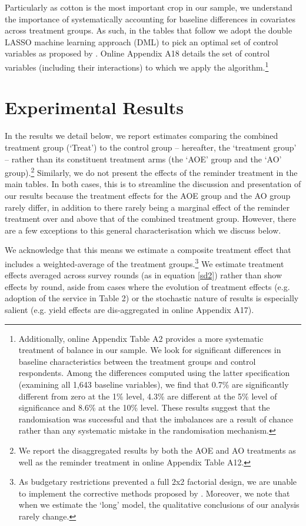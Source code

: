 \documentclass[12pt]{article}
\begin{document}
{\normalsize Particularly as cotton is the most important crop in our sample, we understand the importance of systematically accounting for baseline differences in covariates across treatment groups. As such, in the tables that follow we adopt the double LASSO machine learning approach (DML) to pick an optimal set of control variables as proposed by \citet{belloni2014inference}. Online Appendix A18 details the set of control variables (including their interactions) to which we apply the algorithm.\footnote{Additionally, 
online Appendix Table A2 provides a more systematic treatment of balance in our
sample. We look for significant differences in baseline characteristics
between the treatment groups and control respondents. Among the differences computed using the latter specification
(examining all 1,643 baseline variables), we find that 0.7\% are
significantly different from zero at the 1\% level, 4.3\% are different
at the 5\% level of significance and 8.6\% at the 10\% level. These
results suggest that the randomisation was successful and that the 
imbalances are a result of chance rather than any systematic mistake in the
randomisation mechanism.}}


\section{{\protect\normalsize Experimental Results\label{results}}}

{\normalsize In the results we detail below, we report estimates comparing the combined treatment group (`Treat') to the control group -- hereafter, the `treatment group' -- rather than its constituent treatment arms (the `AOE' group and the `AO' group).\footnote{We report the disaggregated results by both the AOE and AO treatments as well as the reminder treatment in online Appendix Table A12.} Similarly, we do not present the effects of the reminder treatment in the main tables. In both cases, this is to streamline the discussion and presentation of our results because the treatment effects for the AOE group and the AO group rarely differ, in addition to there rarely being a marginal effect of the reminder treatment over and above that of the combined treatment group. However, there are a few exceptions to this general characterisation which we discuss below.}

We acknowledge that this means we estimate a composite treatment effect that includes a weighted-average of the treatment groups.\footnote{As budgetary restrictions prevented a full 2x2 factorial design, we are unable to implement the corrective methods proposed by \citet{muralidharan2019factorial}. Moreover, we note that when we estimate the `long' model, the qualitative conclusions of our analysis rarely change.} We estimate treatment effects averaged across survey rounds (as in equation \eqref{sd2}) rather than show effects by round, aside from cases where the evolution of treatment effects (e.g. adoption of the service in Table 2) or the stochastic nature of results is especially salient (e.g. yield effects are dis-aggregated in online Appendix A17). 
\end{document}
